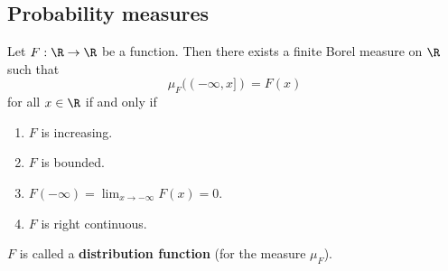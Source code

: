 \subsection{Probability measures}
\begin{thm}
Let $F:\R\to \R$ %
be a function. Then there exists a finite Borel measure on $\R$ such that
\[
\mu_F((-\infty,x])=F(x)
\]
for all $x\in \R$ if and only if
\begin{enumerate}
\item
$F$ is increasing.
\item
$F$ is bounded.
\item
$F(-\infty)=\lim_{x\to -\infty}F(x)=0$.
\item
$F$ is right continuous.
\end{enumerate}
\end{thm}
$F$ is called a \textbf{distribution function} (for the measure $\mu_F$). %

